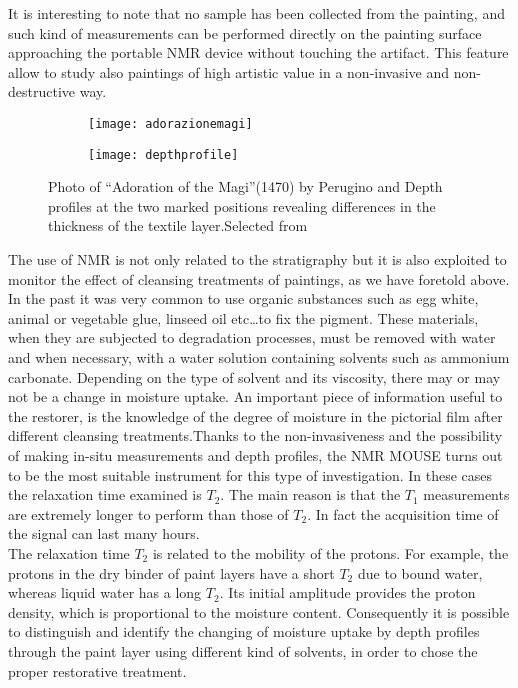 \documentclass[a4paper,11pt]{report}
\begin{document}
It is interesting to note that no sample has been collected from the painting, and such kind of measurements can be performed directly on the painting surface approaching the portable NMR device without touching the artifact. This feature allow to study also paintings of high artistic value in a non-invasive and non-destructive way.
\begin{figure}[h]
	


\begin{subfigure}{0.5\textwidth}
\texttt{[image: adorazionemagi]} 
\caption{}

\end{subfigure}
\begin{subfigure}{0.5\textwidth}
\texttt{[image: depthprofile]}
\caption{}

\end{subfigure}


\caption{Photo of “Adoration of the Magi”(1470) by Perugino and Depth profiles at the two marked positions revealing differences in the thickness of the textile layer.Selected from \cite{quattropaint}}\label{adorazionemagi}
\end{figure}

The use of NMR is not only related to the stratigraphy but it is also exploited to monitor the effect of cleansing treatments of paintings, as we have foretold above. In the past it was very common to use organic substances such as egg white, animal or vegetable glue, linseed oil etc\dots to fix the pigment. These materials, when they are subjected to degradation processes, must be removed with water and when necessary, with a water solution containing solvents such as ammonium carbonate. Depending on the type of solvent and its viscosity, there may or may not be a change in moisture uptake. An important piece of information useful to the restorer, is the knowledge of the degree of moisture in the pictorial film after different cleansing treatments.Thanks to the non-invasiveness and the possibility of making in-situ measurements and depth profiles, the NMR MOUSE turns out to be the most suitable instrument for this type of investigation\cite{exseifresco}.
In these cases the relaxation time examined is $T_2$. The main reason is that the $T_1$ measurements are extremely longer to perform than those of $T_2$. In fact the acquisition time of the signal can last many hours.\\ 
 The relaxation time $T_2$ is related to the mobility of the protons. For example, the protons in the dry binder of paint layers have a short $T_2$ due to bound water, whereas liquid water has a long $T_2$. Its initial amplitude provides the proton density, which is proportional to the moisture content. Consequently it is possible to distinguish and identify the changing of moisture uptake by depth profiles through the paint layer using different kind of solvents, in order to chose the proper restorative treatment\cite{exseifresco}.
\end{document}
